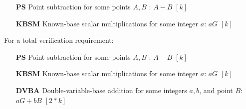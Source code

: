 \begin{itemize}
    \setlength\itemsep{\listspace}
    \item [\textbf{PS}] Point subtraction for some points $A, B$ : $A - B$ \quad \([k]\)
    \item [\textbf{KBSM}] Known-base scalar multiplications for some integer $a$: $a G$ \quad \([k]\)
\end{itemize}

For a total verification requirement:

\begin{itemize}
    \setlength\itemsep{\listspace}
    \item [\textbf{PS}] Point subtraction for some points $A, B$ : $A - B$ \quad \([k]\)
    \item [\textbf{KBSM}] Known-base scalar multiplications for some integer $a$: $a G$ \quad \([k]\)
    \item [\textbf{DVBA}] Double-variable-base addition for some integers $a, b$, and point $B$: $a G + b B$ \quad \([2*k]\)
\end{itemize}